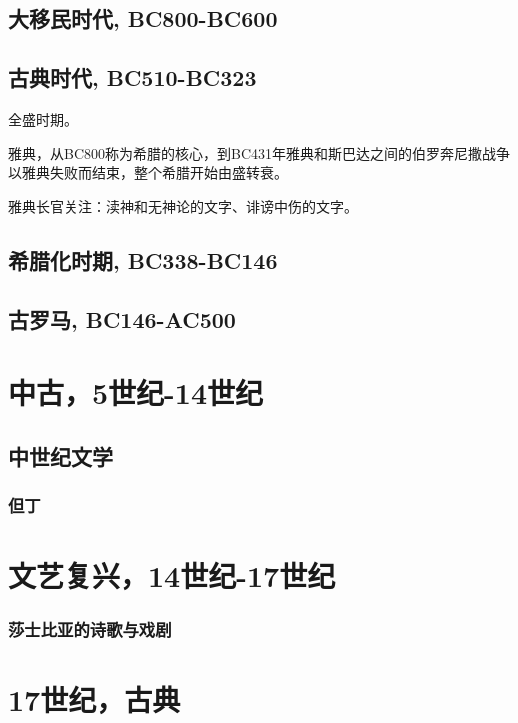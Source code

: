 \documentclass[UTF8]{../../RepresentationUniverse}
\begin{document}
\section{大移民时代, BC800-BC600}

\section{古典时代, BC510-BC323}
全盛时期。

雅典，从BC800称为希腊的核心，到BC431年雅典和斯巴达之间的伯罗奔尼撒战争以雅典失败而结束，整个希腊开始由盛转衰。

雅典长官关注：渎神和无神论的文字、诽谤中伤的文字。

\section{希腊化时期, BC338-BC146}


\section{古罗马, BC146-AC500}






\chapter{中古，5世纪-14世纪}
\section{中世纪文学}


\subsection{但丁}



\chapter{文艺复兴，14世纪-17世纪}



\subsection{莎士比亚的诗歌与戏剧}





\chapter{17世纪，古典}
\end{document}

